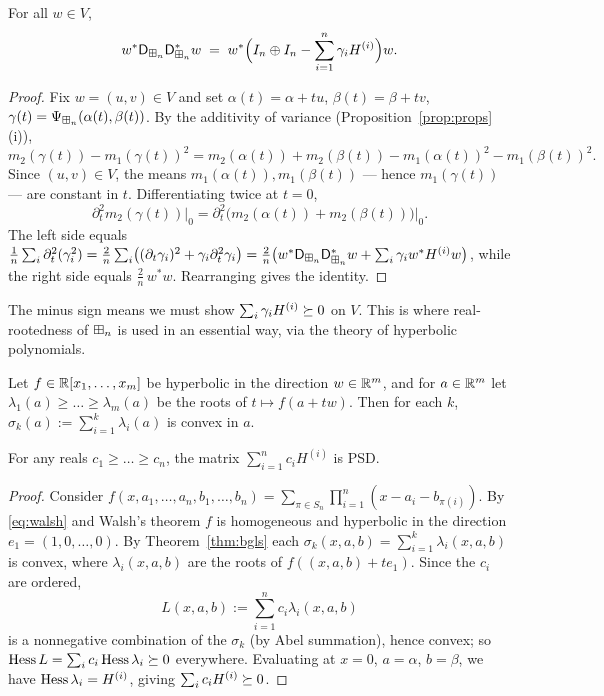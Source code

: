 \documentclass[11pt]{article}
\begin{document}
\begin{qfourlemma}\label{lem:hess}
For all $w\in V$,
\[
w^\ast \mathsf{D}_{\boxplus_n}\mathsf{D}_{\boxplus_n}^\ast w
\;=\;w^\ast\Bigl(I_n\oplus I_n-\sum_{i=1}^n\gamma_i H^{(i)}\Bigr)w.
\]
\end{qfourlemma}

\begin{proof}
Fix $w=(u,v)\in V$ and set $\alpha(t)=\alpha+tu$, $\beta(t)=\beta+tv$,
$\gamma(t)=\Psi_{\boxplus_n}(\alpha(t),\beta(t))$. By the additivity of variance
(Proposition~\ref{prop:props}(i)),
\[
m_2(\gamma(t))-m_1(\gamma(t))^2
=m_2(\alpha(t))+m_2(\beta(t))-m_1(\alpha(t))^2-m_1(\beta(t))^2 .
\]
Since $(u,v)\in V$, the means $m_1(\alpha(t)),m_1(\beta(t))$ — hence
$m_1(\gamma(t))$ — are constant in $t$. Differentiating twice at $t=0$,
\[
\partial_t^2 m_2(\gamma(t))\big|_0=\partial_t^2\bigl(m_2(\alpha(t))+m_2(\beta(t))\bigr)\big|_0 .
\]
The left side equals
$\tfrac1n\sum_i\partial_t^2(\gamma_i^2)
=\tfrac2n\sum_i\bigl((\partial_t\gamma_i)^2+\gamma_i\partial_t^2\gamma_i\bigr)
=\tfrac2n\bigl(w^\ast \mathsf{D}_{\boxplus_n}\mathsf{D}_{\boxplus_n}^\ast w+\sum_i\gamma_i w^\ast H^{(i)}w\bigr)$,
while the right side equals $\tfrac2n\,w^\ast w$. Rearranging gives the
identity.
\end{proof}

The minus sign means we must show $\sum_i\gamma_i H^{(i)}\succeq 0$ on $V$. This is
where real-rootedness of $\boxplus_n$ is used in an essential way, via the theory of
hyperbolic polynomials.

\begin{qfourtheorem}\label{thm:bgls}
Let $f\in\mathbb{R}[x_1,\dots,x_m]$ be hyperbolic in the direction $w\in\mathbb{R}^m$, and for
$a\in\mathbb{R}^m$ let $\lambda_1(a)\ge\dots\ge\lambda_m(a)$ be the roots of
$t\mapsto f(a+tw)$. Then for each $k$, $\sigma_k(a):=\sum_{i=1}^k\lambda_i(a)$ is
convex in $a$.
\end{qfourtheorem}

\begin{qfourcorollary}\label{cor:psd}
For any reals $c_1\ge\dots\ge c_n$, the matrix $\sum_{i=1}^n c_i H^{(i)}$ is PSD.
\end{qfourcorollary}

\begin{proof}
Consider $f(x,a_1,\dots,a_n,b_1,\dots,b_n)=\sum_{\pi\in S_n}\prod_{i=1}^n
(x-a_i-b_{\pi(i)})$. By \eqref{eq:walsh} and Walsh's theorem $f$ is homogeneous
and hyperbolic in the direction $e_1=(1,0,\dots,0)$. By Theorem~\ref{thm:bgls}
each $\sigma_k(x,a,b)=\sum_{i=1}^k\lambda_i(x,a,b)$ is convex, where
$\lambda_i(x,a,b)$ are the roots of $f((x,a,b)+te_1)$. Since the $c_i$ are
ordered,
\[
L(x,a,b):=\sum_{i=1}^n c_i\lambda_i(x,a,b)
\]
is a nonnegative combination of the $\sigma_k$ (by Abel summation), hence convex;
so $\operatorname{Hess} L=\sum_i c_i\operatorname{Hess}\lambda_i\succeq 0$ everywhere. Evaluating at $x=0$,
$a=\alpha$, $b=\beta$, we have $\operatorname{Hess}\lambda_i=H^{(i)}$, giving
$\sum_i c_i H^{(i)}\succeq 0$.
\end{proof}
\end{document}
